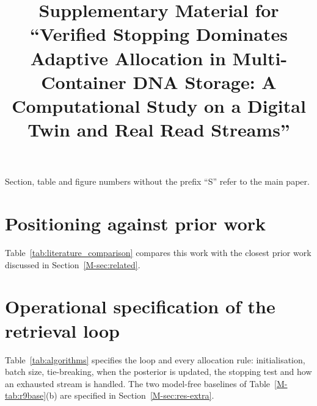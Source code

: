 \documentclass[conference,onecolumn,11pt]{IEEEtran}
\begin{document}
\title{Supplementary Material for ``Verified Stopping Dominates Adaptive Allocation in Multi-Container DNA
Storage: A Computational Study on a Digital Twin and Real Read Streams''}

\author{
\and
{}
\and
{}
}

\maketitle

\noindent Section, table and figure numbers without the prefix ``S'' refer to the main paper.

\section{Positioning against prior work}\label{supp:lit}
Table~\ref{tab:literature_comparison} compares this work with the closest prior work discussed in
Section~\ref{M-sec:related}.


\section{Operational specification of the retrieval loop}\label{supp:alg}
Table~\ref{tab:algorithms} specifies the loop and every allocation rule: initialisation, batch size,
tie-breaking, when the posterior is updated, the stopping test and how an exhausted stream is handled.
The two model-free baselines of Table~\ref{M-tab:r9base}(b) are specified in Section~\ref{M-sec:res-extra}.


\end{document}
